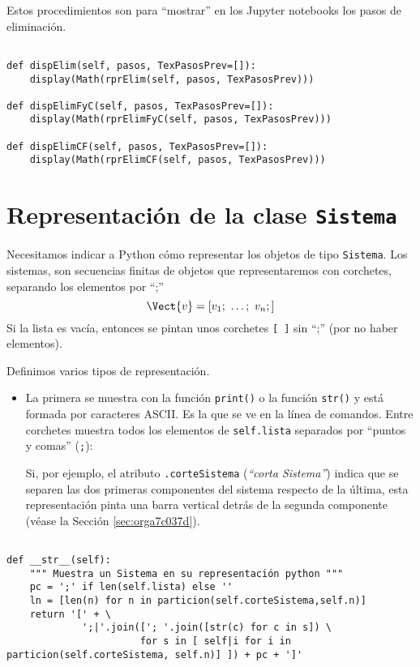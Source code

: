 \documentclass[11pt]{report}
\begin{document}
Estos procedimientos son para ``mostrar'' en los Jupyter notebooks los pasos de eliminación.

\begin{verbatim}

def dispElim(self, pasos, TexPasosPrev=[]):
    display(Math(rprElim(self, pasos, TexPasosPrev)))

def dispElimFyC(self, pasos, TexPasosPrev=[]):
    display(Math(rprElimFyC(self, pasos, TexPasosPrev)))

def dispElimCF(self, pasos, TexPasosPrev=[]):
    display(Math(rprElimCF(self, pasos, TexPasosPrev)))

\end{verbatim}

\section{Representación de la clase \texttt{Sistema}}
\label{sec:org8c6bb9b}
Necesitamos indicar a Python cómo representar los objetos de tipo
\texttt{Sistema}. Los sistemas, son secuencias finitas de objetos que
representaremos con corchetes, separando los elementos por ``;''
\begin{displaymath}
  \Vect{v}=[v_1;\ \ldots;\ v_n;]
\end{displaymath}
Si la lista es vacía, entonces se pintan unos corchetes \texttt{[ ]} sin
 ``;'' (por no haber elementos). 

Definimos varios tipos de representación.

\begin{itemize}
\item La primera se muestra con la función \texttt{print()} o la función \texttt{str()}
y está formada por caracteres ASCII. Es la que se ve en la línea de
comandos. Entre corchetes muestra todos los elementos de
\texttt{self.lista} separados por ``puntos y comas'' (\texttt{;}):

Si, por ejemplo, el atributo \texttt{.corteSistema} (\emph{``corta Sistema''}) indica que
se separen las dos primeras componentes del sistema respecto de la
última, esta representación pinta una barra vertical detrás de la
segunda componente (véase la Sección \ref{sec:orga7c037d}).
\end{itemize}

\begin{verbatim}

def __str__(self):
    """ Muestra un Sistema en su representación python """
    pc = ';' if len(self.lista) else ''
    ln = [len(n) for n in particion(self.corteSistema,self.n)]
    return '[' + \
             ';|'.join(['; '.join([str(c) for c in s]) \
                       for s in [ self|i for i in particion(self.corteSistema, self.n)] ]) + pc + ']'

\end{verbatim}
\end{document}
